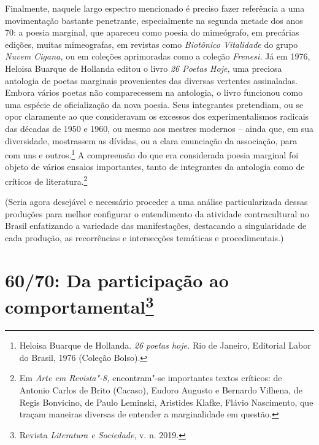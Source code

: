 Finalmente, naquele largo espectro mencionado é preciso fazer referência
a uma movimentação bastante penetrante, especialmente na segunda metade
dos anos 70: a poesia marginal, que apareceu como poesia do mimeógrafo,
em precárias edições, muitas mimeografas, em revistas como %
\emph{Biotônico Vitalidade} do grupo \emph{Nuvem Cigana,} ou em coleções
aprimoradas como a coleção \emph{Frenesi.} Já em 1976, Heloisa Buarque
de Hollanda editou o livro \emph{26 Poetas Hoje,} uma preciosa antologia
de poetas marginais provenientes das diversas vertentes assinaladas.
Embora vários poetas não comparecessem na antologia, o livro funcionou
como uma espécie de oficialização da nova poesia. Seus integrantes
pretendiam, ou se opor claramente ao que consideravam os excessos dos
experimentalismos radicais das décadas de 1950 e 1960, ou mesmo aos
mestres modernos -- ainda que, em sua diversidade, mostrassem as
dívidas, ou a clara enunciação da associação, para com uns e
outros.\footnote{Heloisa Buarque de Hollanda. \emph{26 poetas hoje.} Rio
  de Janeiro, Editorial Labor do Brasil, 1976 (Coleção Bolso).} A
compreensão do que era considerada poesia marginal foi objeto de vários
ensaios importantes, tanto de integrantes da antologia como de críticos
de literatura.\footnote{Em \emph{Arte em Revista"-8,} encontram"-se
  importantes textos críticos: de Antonio Carlos de Brito (Cacaso),
  Eudoro Augusto e Bernardo Vilhena, de Regis Bonvicino, de Paulo
  Leminski, Aristides Klafke, Flávio Nascimento, que traçam maneiras
  diversas de entender a marginalidade em questão.}

\asterisc

(Seria agora desejável e necessário proceder a uma análise
particularizada dessas produções para melhor configurar o entendimento
da atividade contracultural no Brasil enfatizando a variedade das
manifestações, destacando a singularidade de cada produção, as
recorrências e intersecções temáticas e procedimentais.)

\chapter*{60/70: Da participação ao comportamental\footnote{Revista
  \emph{Literatura e Sociedade}, v. n. 2019.}} %

